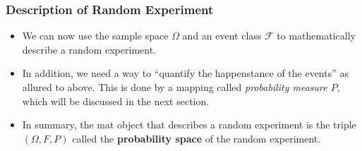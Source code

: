 \subsubsection{Description of Random Experiment}
\begin{itemize}
\item We can now use the sample space \(\Omega\) and an event class \(\mathcal{F}\) to
    mathematically describe a random experiment. 
\item In addition, we need a way to ``quantify the happenstance of the
  events'' as allured to above. This is done by a mapping called
  \emph{probability measure \(P\)}, which will be discussed in the next section.
\item In summary, the mat object that describes a random experiment is
  the triple \((\Omega, F, P)\) called the \textbf{probability space}
  of the random experiment.
\end{itemize}
